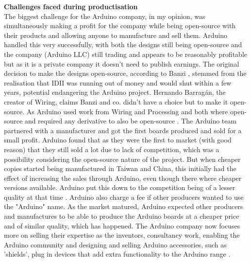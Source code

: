 \textbf{Challenges faced during productisation}\\
The biggest challenge for the Arduino company, in my opinion, was simultaneously making a profit for the company while being open-source with their products and allowing anyone to manufacture and sell them. Arduino handled this very successfully, with both the designs still being open-source and the company (Arduino LLC) still trading and appears to be reasonably profitable but as it is a private company it doesn't need to publish earnings. The original decision to make the designs open-source, according to Banzi 
\cite{RN111} \cite{RN103}, stemmed from the realisation that IDII was running out of money and would shut within a few years, potential endangering the Arduino project. Hernando Barragán, the creator of Wiring, claims Banzi and co. didn't have a choice but to make it open-source. As Arduino used work from Wiring and Processing and both where open-source and required any derivative to also be open-source 
\cite{RN110}. 
The Arduino team partnered with a manufacturer and got the first boards produced and sold for a small profit. Arduino found that as they were the first to market (with good reason) that they still sold a lot due to lack of competition, which was a possibility considering the open-source nature of the project. But when cheaper copies started being manufactured in Taiwan and China, this initially had the effect of increasing the sales through Arduino, even though there where cheaper versions available. Arduino put this down to the competition being of a lesser quality at that time 
\cite{RN113}. Arduino also charge a fee if other producers wanted to use the "Arduino" name. As the market matured, Arduino expected other producers and manufactures to be able to produce the Arduino boards at a cheaper price and of similar quality, which has happened. The Arduino company now focuses more on selling their expertise as the inventors, consultancy work, enabling the Arduino community and designing and selling Arduino accessories, such as 'shields', plug in devices that add extra functionality to the Arduino range 
\cite{RN113}.

